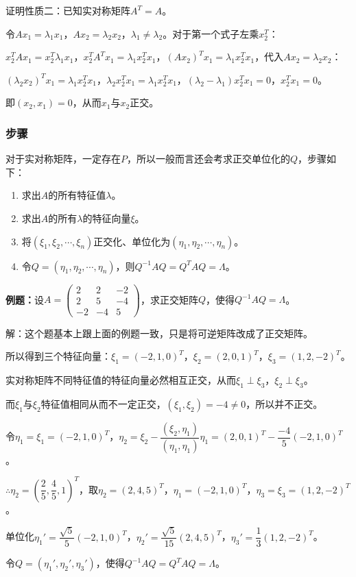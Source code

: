\documentclass[UTF8, 12pt]{ctexart}
\begin{document}
证明性质二：已知实对称矩阵$A^T=A$。

令$Ax_1=\lambda_1x_1$，$Ax_2=\lambda_2x_2$，$\lambda_1\neq\lambda_2$。对于第一个式子左乘$x_2^T$：

$x_2^TAx_1=x_2^T\lambda_1x_1$，$x_2^TA^Tx_1=\lambda_1x_2^Tx_1$，$(Ax_2)^Tx_1=\lambda_1x_2^Tx_1$，代入$Ax_2=\lambda_2x_2$：

$(\lambda_2x_2)^Tx_1=\lambda_1x_2^Tx_1$，$\lambda_2x_2^Tx_1=\lambda_1x_2^Tx_1$，$(\lambda_2-\lambda_1)x_2^Tx_1=0$，$x_2^Tx_1=0$。

即$(x_2,x_1)=0$，从而$x_1$与$x_2$正交。

\subsubsection{步骤}

对于实对称矩阵，一定存在$P$，所以一般而言还会考求正交单位化的$Q$，步骤如下：

\begin{enumerate}
    \item 求出$A$的所有特征值$\lambda$。
    \item 求出$A$的所有$\lambda$的特征向量$\xi$。
    \item 将$(\xi_1,\xi_2,\cdots,\xi_n)$正交化、单位化为$(\eta_1,\eta_2,\cdots,\eta_n)$。
    \item 令$Q=(\eta_1,\eta_2,\cdots,\eta_n)$，则$Q^{-1}AQ=Q^TAQ=\Lambda$。
\end{enumerate}

\textbf{例题：}设$A=\left(\begin{array}{ccc}
    2 & 2 & -2 \\
    2 & 5 & -4 \\
    -2 & -4 & 5
\end{array}\right)$，求正交矩阵$Q$，使得$Q^{-1}AQ=\Lambda$。\medskip

解：这个题基本上跟上面的例题一致，只是将可逆矩阵改成了正交矩阵。

所以得到三个特征向量：$\xi_1=(-2,1,0)^T$，$\xi_2=(2,0,1)^T$，$\xi_3=(1,2,-2)^T$。

实对称矩阵不同特征值的特征向量必然相互正交，从而$\xi_1\perp\xi_3$，$\xi_2\perp\xi_3$。

而$\xi_1$与$\xi_2$特征值相同从而不一定正交，$(\xi_1,\xi_2)=-4\neq0$，所以并不正交。

令$\eta_1=\xi_1=(-2,1,0)^T$，$\eta_2=\xi_2-\dfrac{(\xi_2,\eta_1)}{(\eta_1,\eta_1)}\eta_1=(2,0,1)^T-\dfrac{-4}{5}(-2,1,0)^T$。

$\therefore\eta_2=\left(\dfrac{2}{5},\dfrac{4}{5},1\right)^T$，取$\eta_2=(2,4,5)^T$，$\eta_1=(-2,1,0)^T$，$\eta_3=\xi_3=(1,2,-2)^T$。

单位化$\eta_1'=\dfrac{\sqrt{5}}{5}(-2,1,0)^T$，$\eta_2'=\dfrac{\sqrt{5}}{15}(2,4,5)^T$，$\eta_3'=\dfrac{1}{3}(1,2,-2)^T$。

令$Q=(\eta_1',\eta_2',\eta_3')$，使得$Q^{-1}AQ=Q^TAQ=\Lambda$。
\end{document}

